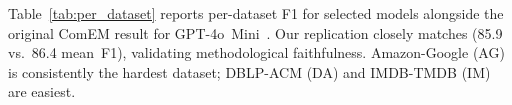\documentclass[runningheads]{llncs}
\begin{document}

Table~\ref{tab:per_dataset} reports per-dataset F1 for selected models alongside the original ComEM result for GPT-4o~Mini~\cite{wang2025match}. Our replication closely matches (85.9 vs.\ 86.4 mean~F1), validating methodological faithfulness. Amazon-Google (AG) is consistently the hardest dataset; DBLP-ACM (DA) and IMDB-TMDB (IM) are easiest.
\end{document}
